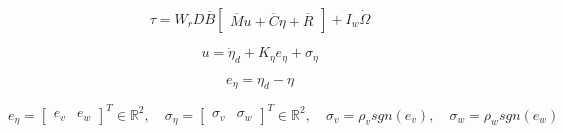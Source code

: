 \begin{equation}
\label{eq:eloirtnyomatek}
\tau = W_rD\overline{B}\begin{bmatrix}
\overline{M}u+\overline{C}\eta +\overline{R}
\end{bmatrix} + I_w \dot\Omega 
\end{equation}

\begin{equation}
    \label{eq:controllertorque1}
    u = \dot \eta_d + K_\eta e_\eta  + \sigma_\eta  
\end{equation}

\begin{equation}
    e_\eta = \eta _d - \eta
\end{equation}

\begin{equation}
    e_\eta = \begin{bmatrix}
e_v & e_w 
\end{bmatrix}^T \in \mathbb{R}^2
,\quad
\sigma_\eta = \begin{bmatrix}
\sigma_v & \sigma_w 
\end{bmatrix}^T \in \mathbb{R}^2
,\quad
\sigma_v = \rho _v sgn(e_v)
, \quad
\sigma_w = \rho _w sgn(e_w)
\end{equation}